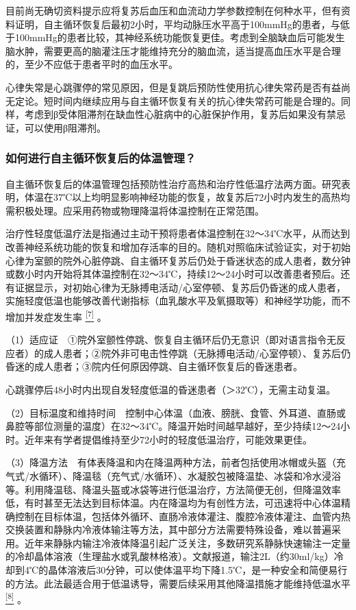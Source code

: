 目前尚无确切资料提示应将复苏后血压和血流动力学参数控制在何种水平，但有资料证明，自主循环恢复后最初2小时，平均动脉压水平高于100mmHg的患者，与低于100mmHg的患者比较，其神经系统功能恢复更佳。考虑到全脑缺血后可能发生脑水肿，需要更高的脑灌注压才能维持充分的脑血流，适当提高血压水平是合理的，至少不应低于患者平时的血压水平。

心律失常是心跳骤停的常见原因，但是复跳后预防性使用抗心律失常药是否有益尚无定论。短时间内继续应用与自主循环恢复有关的抗心律失常药可能是合理的。同样，考虑到β受体阻滞剂在缺血性心脏病中的心脏保护作用，复苏后如果没有禁忌证，可以使用β阻滞剂。

\subsubsection{如何进行自主循环恢复后的体温管理？}

自主循环恢复后的体温管理包括预防性治疗高热和治疗性低温疗法两方面。研究表明，体温在37℃以上均明显影响神经功能的恢复，故复苏后72小时内发生的高热均需积极处理。应采用药物或物理降温将体温控制在正常范围。

治疗性轻度低温疗法是指通过主动干预将患者体温控制在32～34℃水平，从而达到改善神经系统功能的恢复和增加存活率的目的。随机对照临床试验证实，对于初始心律为室颤的院外心脏停跳、自主循环复苏后仍处于昏迷状态的成人患者，数分钟或数小时内开始将其体温控制在32～34℃，持续12～24小时可以改善患者预后。还有证据显示，对初始心律为无脉搏电活动/心室停顿、复苏后仍昏迷的成人患者，实施轻度低温也能够改善代谢指标（血乳酸水平及氧摄取等）和神经学功能，而不增加并发症发生率
\protect\hyperlink{text00023.htmlux5cux23ch7-22}{\textsuperscript{{[}7{]}}}
。

（1）适应证　①院外室颤性停跳、恢复自主循环后仍无意识（即对语言指令无反应者）的成人患者；②院外非可电击性停跳（无脉搏电活动/心室停顿）、复苏后仍昏迷的成人患者；③院内任何原因停跳、自主循环恢复后的昏迷患者。

心跳骤停后48小时内出现自发轻度低温的昏迷患者（＞32℃），无需主动复温。

（2）目标温度和维持时间　控制中心体温（血液、膀胱、食管、外耳道、直肠或鼻腔等部位测量的温度）在32～34℃。降温开始时间越早越好，至少持续12～24小时。近年来有学者提倡维持至少72小时的轻度低温治疗，可能效果更佳。

（3）降温方法　有体表降温和内在降温两种方法，前者包括使用冰帽或头盔（充气式/水循环）、降温毯（充气式/水循环）、水凝胶包被降温垫、冰袋和冷水浸浴等。利用降温毯、降温头盔或冰袋等进行低温治疗，方法简便无创，但降温效率低，有时甚至无法达到目标体温。内在降温均为有创性方法，可迅速将中心体温精确控制在目标体温，包括体外循环、直肠冷液体灌注、腹腔冷液体灌注、血管内热交换装置和静脉内冷液体输注等方法，其中部分方法需要特殊设备，难以普遍采用。近年来静脉内输注冷液体降温引起广泛关注，多数研究系静脉快速输注一定量的冷却晶体溶液（生理盐水或乳酸林格液）。文献报道，输注2L（约30ml/kg）冷却到4℃的晶体溶液后30分钟，可以使体温平均下降1.5℃，是一种安全和简便易行的方法。此法最适合用于低温诱导，需要后续采用其他降温措施才能维持低温水平
\protect\hyperlink{text00023.htmlux5cux23ch8-22}{\textsuperscript{{[}8{]}}}
。

